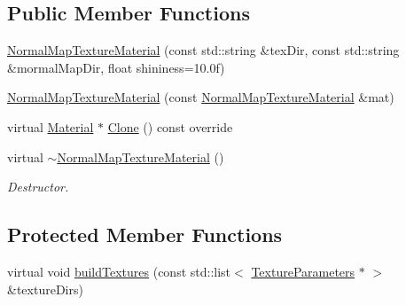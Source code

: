 \subsection*{Public Member Functions}
\begin{DoxyCompactItemize}
\item 
\mbox{\hyperlink{class_geometry_engine_1_1_geometry_material_1_1_normal_map_texture_material_a40bc97d75e88354b1bbe58bb5d804a3d}{Normal\+Map\+Texture\+Material}} (const std\+::string \&tex\+Dir, const std\+::string \&mormal\+Map\+Dir, float shininess=10.\+0f)
\item 
\mbox{\hyperlink{class_geometry_engine_1_1_geometry_material_1_1_normal_map_texture_material_ad2ab5dd8a66c2cb63a23f6d8766cab98}{Normal\+Map\+Texture\+Material}} (const \mbox{\hyperlink{class_geometry_engine_1_1_geometry_material_1_1_normal_map_texture_material}{Normal\+Map\+Texture\+Material}} \&mat)
\item 
virtual \mbox{\hyperlink{class_geometry_engine_1_1_geometry_material_1_1_material}{Material}} $\ast$ \mbox{\hyperlink{class_geometry_engine_1_1_geometry_material_1_1_normal_map_texture_material_a3a3d1f16cf175f084bc3eeab56f6e42f}{Clone}} () const override
\item 
\mbox{\label{class_geometry_engine_1_1_geometry_material_1_1_normal_map_texture_material_acd715bac31e62bc845f7417b452f2f95}} 
virtual \mbox{\hyperlink{class_geometry_engine_1_1_geometry_material_1_1_normal_map_texture_material_acd715bac31e62bc845f7417b452f2f95}{$\sim$\+Normal\+Map\+Texture\+Material}} ()
\begin{DoxyCompactList}\small\item\em Destructor. \end{DoxyCompactList}\end{DoxyCompactItemize}
\subsection*{Protected Member Functions}
\begin{DoxyCompactItemize}
\item 
virtual void \mbox{\hyperlink{class_geometry_engine_1_1_geometry_material_1_1_normal_map_texture_material_a42321fbd382c20de406f80d44849c183}{build\+Textures}} (const std\+::list$<$ \mbox{\hyperlink{class_geometry_engine_1_1_geometry_material_1_1_texture_parameters}{Texture\+Parameters}} $\ast$ $>$ \&texture\+Dirs)
\end{DoxyCompactItemize}
